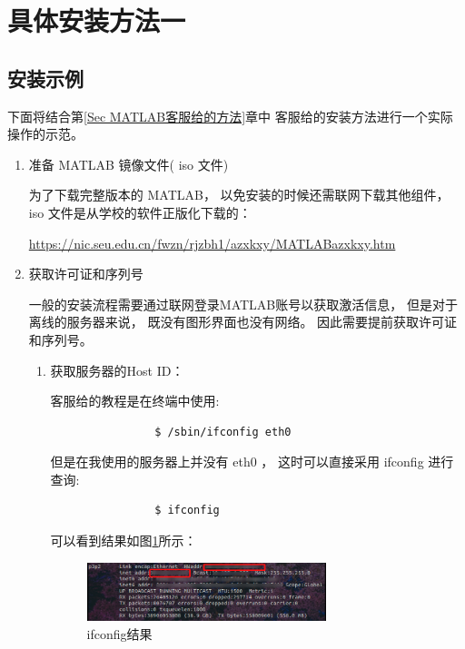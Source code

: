 \documentclass[UTF8]{article}   %
\numberwithin{equation}{section} %
\begin{document}
\section{具体安装方法一}
\label{Sec 具体安装方法一}
\subsection{安装示例}
\label{SubSec 安装示例}
下面将结合第{\ref{Sec MATLAB客服给的方法}}章中
客服给的安装方法进行一个实际操作的示范。
\begin{enumerate}
	\item 准备 MATLAB 镜像文件( iso 文件)

		为了下载完整版本的 MATLAB，
		以免安装的时候还需联网下载其他组件，
		iso 文件是从学校的软件正版化下载的：

		\href{https://nic.seu.edu.cn/fwzn/rjzbh1/azxkxy/MATLABazxkxy.htm}{https://nic.seu.edu.cn/fwzn/rjzbh1/azxkxy/MATLABazxkxy.htm}
	\item 获取许可证和序列号

		一般的安装流程需要通过联网登录MATLAB账号以获取激活信息，
		但是对于离线的服务器来说，
		既没有图形界面也没有网络。
		因此需要提前获取许可证和序列号。

		\begin{enumerate}
		\item 获取服务器的Host ID：
			
			客服给的教程是在终端中使用:
			
			\begin{verbatim}
			    $ /sbin/ifconfig eth0
			\end{verbatim}

			但是在我使用的服务器上并没有 eth0 ，
			这时可以直接采用 ifconfig 进行查询:
			\begin{verbatim}
			    $ ifconfig
			\end{verbatim}

			可以看到结果如图{\ref{Fig ifconfig结果}}所示：
			\begin{figure}[H]
			  \centering
			  \includegraphics[width=0.7\textwidth]{./pic/ifconfig}
			  \caption{ifconfig结果}
			  \label{Fig ifconfig结果}
			\end{figure}


\end{enumerate}
\end{enumerate}
\end{document}
